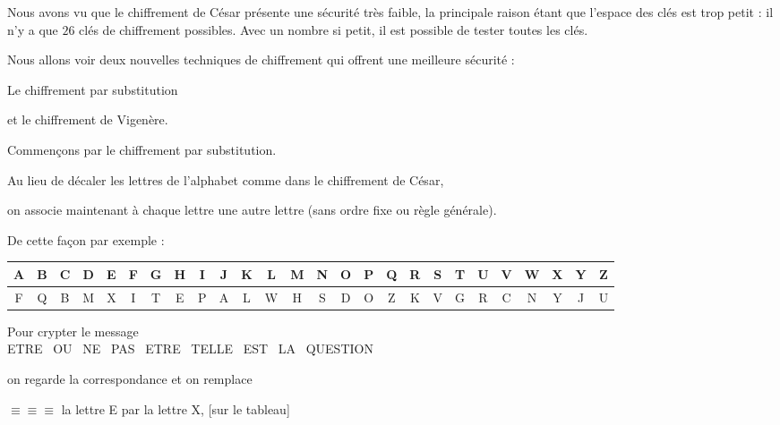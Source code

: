 







\debuttexte

\diapo

Nous avons vu que le chiffrement de César présente une sécurité très faible, 
la principale raison étant que l'espace des clés est trop petit : il n'y a que $26$
clés de chiffrement possibles. Avec un nombre si petit, il est possible de tester toutes les clés.

\change

Nous allons voir deux nouvelles techniques de chiffrement qui offrent une meilleure sécurité :

\change

Le chiffrement par substitution

\change

et le chiffrement de Vigenère.


\diapo

Commençons par le chiffrement par substitution.

Au lieu de décaler les lettres de l'alphabet comme dans le chiffrement de César, 

on associe maintenant à chaque lettre une autre lettre (sans ordre fixe ou règle générale).

\change

De cette façon par exemple :

{\small
\begin{tabular}{|*{26}{c|}}
\hline
A&B&C&D&E&F&G&H&I&J&K&L&M&N&O&P&Q&R&S&T&U&V&W&X&Y&Z\\
\hline
F&Q&B&M&X&I&T&E&P&A&L&W&H&S&D&O&Z&K&V&G&R&C&N&Y&J&U\\
\hline
\end{tabular}  
}
\medskip

\change

Pour crypter le message \\
{ETRE \ OU \ NE \ PAS \ ETRE \ TELLE \ EST \ LA \ QUESTION}

\change


on regarde la correspondance et on remplace 

$\equiv \equiv \equiv $ la lettre E par la lettre X, [sur le tableau]

